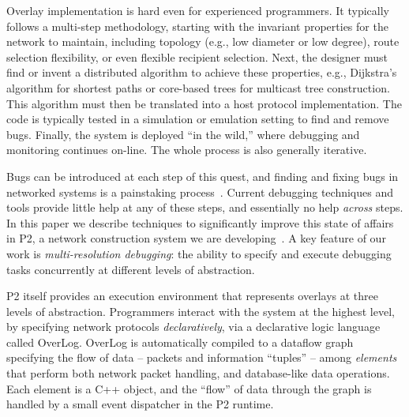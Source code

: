 \documentclass[10pt,twocolumn]{article}
\def\Sys{P2\xspace}
\def\Lang{OverLog\xspace}
\begin{document}
Overlay implementation is hard even for
experienced programmers.  It typically follows a multi-step
methodology, starting with the invariant
properties for the network to maintain, including topology (e.g., low
diameter or low degree), route selection flexibility, or even flexible
recipient selection.  Next, 
the designer must find or invent a distributed algorithm to
achieve these properties, e.g., Dijkstra's algorithm for shortest
paths or core-based
trees for multicast tree construction.  This algorithm
must then be translated into a host protocol implementation.
The code is typically tested in a simulation or emulation
setting
to find and remove bugs. Finally, the system is deployed ``in the
wild,'' where debugging and monitoring continues on-line.  The whole
process is also generally iterative. 

Bugs can be introduced at each step of this quest,
and finding and fixing bugs in networked systems is a
painstaking process~\cite{jones-04,muir-worlds04}.
Current debugging techniques and tools provide little help
at any of these steps, and essentially no help {\em across} steps.  In
this paper we describe techniques to significantly
improve this state of affairs in \Sys, a network construction system
we are developing~\cite{Loo2005SOSP}.  A key feature of our
work is {\em multi-resolution debugging}: the
ability to specify and execute debugging tasks concurrently at different
levels of abstraction.  


\Sys itself provides an execution
environment that represents overlays at three levels of
abstraction.  Programmers interact with the system at the highest
level, by specifying network protocols {\em declaratively}, via a
declarative logic language called \Lang. 
\Lang is automatically compiled to
a dataflow graph specifying the flow of data -- packets and information
``tuples'' -- among {\em elements}
that perform both network packet handling,
and database-like data operations.  Each element is
a C++ object, and the ``flow'' of data through the graph is handled
by a small event dispatcher in the \Sys runtime.
\end{document}
